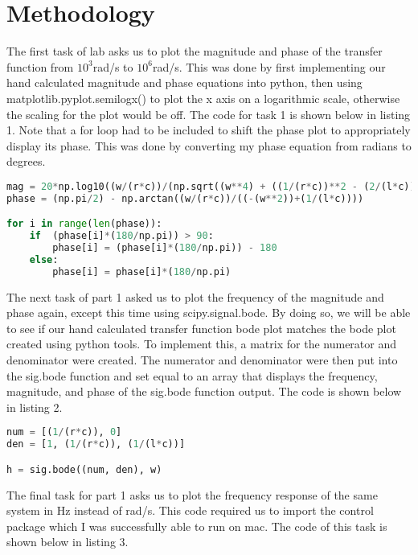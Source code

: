 \documentclass[12pt]{report}
\begin{document}
\section{Methodology}
\hspace{\parindent}The first task of lab asks us to plot the magnitude and phase of the transfer function from \(10^3\)rad/s to \(10^6\)rad/s. This was done by first implementing our hand calculated magnitude and phase equations into python, then using matplotlib.pyplot.semilogx() to plot the x axis on a logarithmic scale, otherwise the scaling for the plot would be off. The code for task 1 is shown below in listing 1. Note that a for loop had to be included to shift the phase plot to appropriately display its phase. This was done by converting my phase equation from radians to degrees. \par
\begin{lstlisting}[language=Python, caption=Part 1 Task 1 Code]
mag = 20*np.log10((w/(r*c))/(np.sqrt((w**4) + ((1/(r*c))**2 - (2/(l*c)))*(w**2) + (1/(l*c))**2)))
phase = (np.pi/2) - np.arctan((w/(r*c))/((-(w**2))+(1/(l*c))))

for i in range(len(phase)):
    if  (phase[i]*(180/np.pi)) > 90:
        phase[i] = (phase[i]*(180/np.pi)) - 180
    else:
        phase[i] = phase[i]*(180/np.pi)
\end{lstlisting}
\hspace{\parindent}The next task of part 1 asked us to plot the frequency of the magnitude and phase again, except this time using scipy.signal.bode. By doing so, we will be able to see if our hand calculated transfer function bode plot matches the bode plot created using python tools. To implement this, a matrix for the numerator and denominator were created. The numerator and denominator were then put into the sig.bode function and set equal to an array that displays the frequency, magnitude, and phase of the sig.bode function output. The code is shown below in listing 2. \par
\begin{lstlisting}[language=Python, caption=Part 1 Task 2 Code]
num = [(1/(r*c)), 0]
den = [1, (1/(r*c)), (1/(l*c))]

h = sig.bode((num, den), w)
\end{lstlisting}
\hspace{\parindent}The final task for part 1 asks us to plot the frequency response of the same system in Hz instead of rad/s. This code required us to import the control package which I was successfully able to run on mac. The code of this task is shown below in listing 3.
\end{document}
